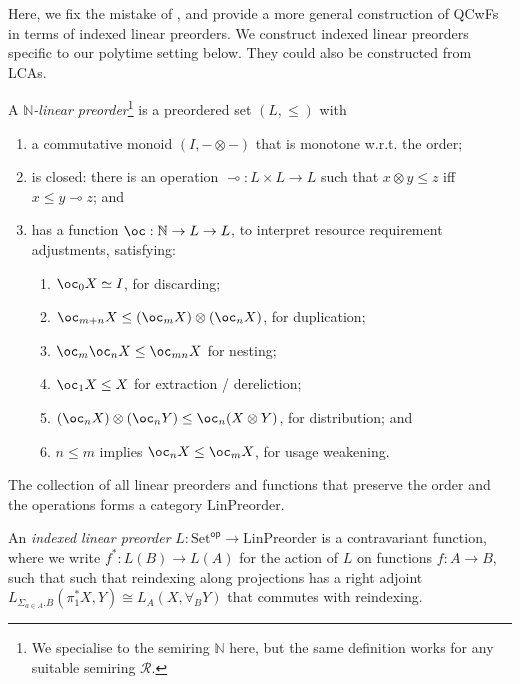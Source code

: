 \documentclass[acmsmall,screen]{acmart}
\newcommand{\Set}{\mathrm{Set}}
\newcommand{\op}{\mathsf{op}}
\newcommand{\LinPreorder}{\mathrm{LinPreorder}}
\begin{document}
Here, we fix the mistake of \citet{atkey18qtt}, and provide a more
general construction of QCwFs in terms of indexed linear preorders. We
construct indexed linear preorders specific to our polytime setting
below. They could also be constructed from LCAs.

\begin{definition}\label{def:indexed-linear-preorder}
  A \emph{$\mathbb{N}$-linear preorder}\footnote{We specialise to the semiring $\mathbb{N}$ here, but the same definition works for any suitable semiring $\mathcal{R}$.} is a preordered set
  $(L, \leq)$ with
  \begin{enumerate}
  \item a commutative monoid $(I, -\otimes-)$ that is monotone
    w.r.t. the order;
  \item is closed: there is an operation
    $\multimap : L \times L \to L$ such that $x \otimes y \leq z$ iff
    $x \leq y \multimap z$; and
  \item has a function $\oc : \mathbb{N} \to L \to L$, to interpret
    resource requirement adjustments, satisfying:
    \begin{enumerate}
    \item $\oc_0 X \simeq I$, for discarding;
    \item $\oc_{m+n} X \leq (\oc_m X) \otimes (\oc_n X)$, for duplication;
    \item $\oc_m\oc_n X \leq \oc_{mn} X$ for nesting;
    \item $\oc_1 X \leq X$ for extraction / dereliction;
    \item $(\oc_n X) \otimes (\oc_n Y) \leq \oc_n(X \otimes Y)$, for distribution; and
    \item $n \leq m$ implies $\oc_n X \leq \oc_m X$, for usage weakening.
    \end{enumerate}
  \end{enumerate}
  The collection of all linear preorders and functions that preserve the
  order and the operations forms a category $\LinPreorder$.

  An \emph{indexed linear preorder} $L : \Set^\op \to \LinPreorder$ is
  a contravariant function, where we write $f^* : L(B) \to L(A)$ for
  the action of $L$ on functions $f : A \to B$, such that such that
  reindexing along projections has a right adjoint
  $L_{\Sigma_{a \in A}.B}(\pi_1^*X, Y) \cong L_{A}(X, \forall_B Y)$
  that commutes with reindexing.
\end{definition}
\end{document}
